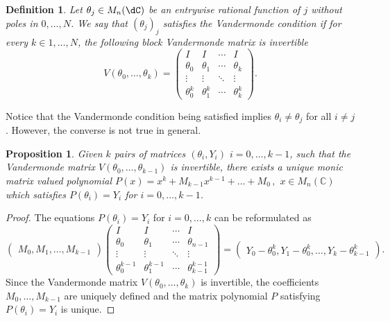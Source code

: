 \documentclass[a4paper,reqno]{amsart}
\newtheorem{proposition}[theorem]{Proposition}
\newtheorem{definition}[theorem]{Definition}
\theoremstyle{definition}
\numberwithin{equation}{section}
\begin{document}
\begin{definition}
\label{def:vandermonde}
Let $\theta_j\in M_n(\dC)$ be an entrywise rational function of $j$
without poles in $0,\ldots,N$. We say that $(\theta_j)_j$ satisfies the Vandermonde condition if for every $k\in 1,\ldots,N$, the following block Vandermonde matrix is invertible
\begin{equation}
\label{eq:vandermonde}
V(\theta_0,\ldots,\theta_k)=\begin{pmatrix} I & I & \cdots & I \\
\theta_0 & \theta_1& \cdots & \theta_k \\
\vdots & \vdots & \ddots & \vdots \\
\theta_0^k &\theta_1^k & \cdots & \theta_k^k
\end{pmatrix}.
\end{equation}
\end{definition}
Notice that the Vandermonde condition being satisfied implies $\theta_i\neq \theta_j$ for all $i\neq j$. However, the converse is not true in general.  
\begin{proposition}
\label{thm:interpolation}
Given $k$ pairs of matrices $(\theta_i,Y_i)$ $i=0,\ldots,k-1$, such that the Vandermonde matrix $V(\theta_0,\ldots,\theta_{k-1})$ is invertible, there exists a unique monic matrix valued polynomial $P(x)=x^{k}+M_{k-1} x^{k-1}+\ldots+M_0\,,$ $x\in M_n(\mathbb{C})$
which satisfies $P(\theta_i)=Y_i$ for $i=0,\ldots,k-1$.
\end{proposition}
\begin{proof}
The equations $P(\theta_i)=Y_i$ for $i=0,\ldots,k$ can be reformulated as
    \begin{equation}
  \begin{pmatrix}
    M_0,M_1,\ldots,M_{k-1}
\end{pmatrix}\begin{pmatrix} I & I & \cdots & I \\
\theta_0 & \theta_1& \cdots & \theta_{n-1} \\
\vdots & \vdots & \ddots & \vdots \\
\theta_0^{k-1} &\theta_1^{k-1} & \cdots & \theta_{k-1}^{k-1}
\end{pmatrix}=\begin{pmatrix}
    Y_0-\theta_0^k,Y_1-\theta_0^k,\ldots,Y_{k}-\theta_{k-1}^k
\end{pmatrix}. 
\end{equation} 
Since the Vandermonde matrix $V(\theta_0, \ldots, \theta_k)$ is invertible, the coefficients $M_0, \ldots, M_{k-1}$ are uniquely defined and the matrix polynomial $P$ satisfying $P(\theta_i)=Y_i$ is unique. 
\end{proof}
\end{document}
